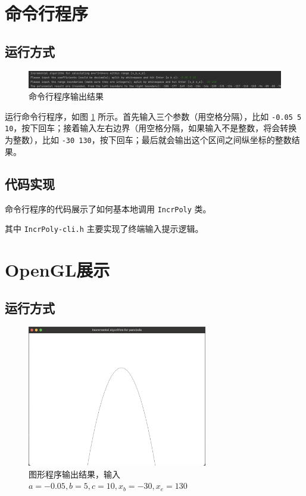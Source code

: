\documentclass[math-font=newcm]{sjtuarticle}
\providecommand{\code}[2]{}
\begin{document}
\code{../source/IncrPoly/IncrPoly.hpp}{c++}

\section{命令行程序}

\subsection{运行方式}\label{sec:cliinput}

\begin{figure}[h]
    \includegraphics[width=\textwidth]{cli.png}
    \caption{命令行程序输出结果}\label{fig:cli}
\end{figure}

运行命令行程序，如图 \ref{fig:cli} 所示。首先输入三个参数（用空格分隔），比如 \verb"-0.05 5 10"，按下回车；接着输入左右边界（用空格分隔，如果输入不是整数，将会转换为整数），比如 \verb"-30 130"，按下回车；最后就会输出这个区间之间纵坐标的整数结果。

\subsection{代码实现}

命令行程序的代码展示了如何基本地调用 \verb"IncrPoly" 类。

\code{../source/IncrPoly/main.cpp}{c++}

\lstset{basicstyle=\ttfamily\scriptsize}

其中 \verb"IncrPoly-cli.h" 主要实现了终端输入提示逻辑。

\code{../source/IncrPoly/IncrPoly-cli.h}{c++}

\section{OpenGL展示}

\subsection{运行方式}

\begin{figure}[h]
    \centering
    \includegraphics[width=0.7\textwidth]{gui.png}
    \caption{图形程序输出结果，输入 $a=-0.05,b=5,c=10,x_b=-30,x_e=130$}\label{fig:gui}
\end{figure}
\end{document}
